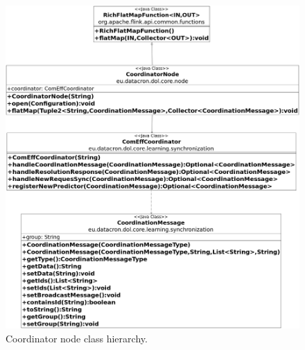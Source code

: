  \begin{figure}[H]
	\centering
	\includegraphics[width=\textwidth,height=\linewidth]{chapters/figures/coordinator_diagram.png}
	
	\caption{Coordinator node class hierarchy.}
	\label{fig:coord_class_diagram}
\end{figure}